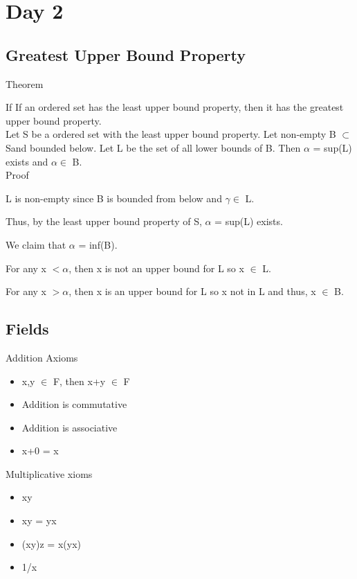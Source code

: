 \newpage
\section[Day 2:]{Day 2}

\subsection{Greatest Upper Bound Property} 
{ \color{blue} Theorem }

\begin{adjustbox}{minipage=14cm, right}
	

If If an ordered set has the least upper bound property, then it has the greatest upper bound property. \\

Let S be a ordered set with the least upper bound property. Let non-empty B $\subset$ Sand bounded below.
Let L be the set of all lower bounds of B. Then $\alpha$ = sup(L) exists and $\alpha \in$ B. \\
\end{adjustbox}

{ \color{magenta} Proof }

L is non-empty since B is bounded from below and $\gamma \in$ L.

Thus, by the least upper bound property of S, $\alpha$ = sup(L) exists.

We claim that $\alpha$ = inf(B).

For any x $< \alpha$, then x is not an upper bound for L so x $\in$ L.

For any x $> \alpha$, then x is an upper bound for L so x not in L and thus, x $\in$ B.

\subsection{Fields}

Addition Axioms
\begin{itemize}[leftmargin=2cm]
	\item x,y $\in$ F, then x+y $\in$ F
	\item Addition is commutative
	\item Addition is associative
	\item x+0 = x
\end{itemize}


Multiplicative xioms
\begin{itemize}[leftmargin=2cm]
	\item xy
	\item xy = yx
	\item (xy)z = x(yx)
	\item 1/x
\end{itemize}

